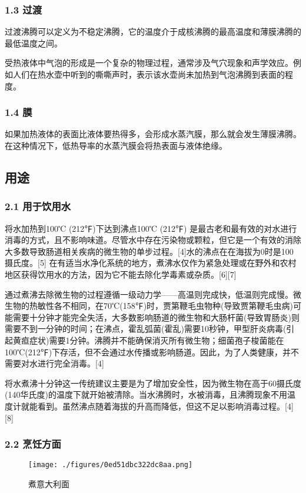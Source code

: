 \subsubsection{1.3 过渡}
过渡沸腾可以定义为不稳定沸腾，它的温度介于成核沸腾的最高温度和薄膜沸腾的最低温度之间。

受热液体中气泡的形成是一个复杂的物理过程，通常涉及气穴现象和声学效应。例如人们在热水壶中听到的嘶嘶声时，表示该水壶尚未加热到气泡沸腾到表面的程度。

\subsubsection{1.4 膜}
如果加热液体的表面比液体要热得多，会形成水蒸汽膜，那么就会发生薄膜沸腾。在这种情况下，低热导率的水蒸汽膜会将热表面与液体绝缘。

\subsection{用途}
\subsubsection{2.1 用于饮用水}
将水加热到100℃ (212℉)下达到沸点100℃ (212℉) 是最古老和最有效的对水进行消毒的方式，且不影响味道。尽管水中存在污染物或颗粒，但它是一个有效的消除大多数导致肠道相关疾病的微生物的单步过程。[4]水的沸点在在海拔为0时是100摄氏度。[5] 在有适当水净化系统的地方，煮沸水仅作为紧急处理或在野外和农村地区获得饮用水的方法，因为它不能去除化学毒素或杂质。[6][7]

通过煮沸去除微生物的过程遵循一级动力学——高温则完成快，低温则完成慢。微生物的热敏性各不相同，在70℃(158℉)时，贾第鞭毛虫物种(导致贾第鞭毛虫病)可能需要十分钟才能完全失活，大多数影响肠道的微生物和大肠杆菌(导致胃肠炎)则需要不到一分钟的时间；在沸点，霍乱弧菌(霍乱)需要10秒钟，甲型肝炎病毒(引起黄疸症状)需要1分钟。沸腾并不能确保消灭所有微生物；细菌孢子梭菌能在100℃(212℉)下存活，但不会通过水传播或影响肠道。因此，为了人类健康，并不需要对水进行完全消毒。[4]

将水煮沸十分钟这一传统建议主要是为了增加安全性，因为微生物在高于60摄氏度(140华氏度)的温度下就开始被清除。当水沸腾时，水被消毒，且沸腾现象不用温度计就能看到。虽然沸点随着海拔的升高而降低，但这不足以影响消毒过程。[4][8]

\subsubsection{2.2 烹饪方面}
\begin{figure}[ht]
\centering
\texttt{[image: ./figures/0ed51dbc322dc8aa.png]}
\caption{煮意大利面} \label{fig_FT_2}
\end{figure}
